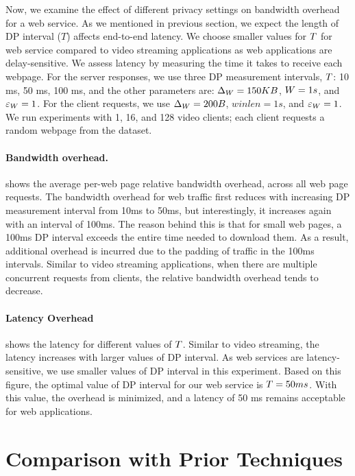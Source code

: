 Now, we examine the effect of different privacy settings on bandwidth overhead for a web service.
As we mentioned in previous section, we expect the length of DP interval ($T$) affects end-to-end latency.
We choose smaller values for $T$ for web service compared to video streaming applications as web applications are delay-sensitive.
We assess latency by measuring the time it takes to receive each webpage.
For the server responses, we use three DP measurement intervals, $T$: 10 ms, 50 ms, 100 ms, and the other parameters are: $\Delta_{W} = 150 KB$, $W = 1s$, and
$\varepsilon_{W} = 1$.
For the client requests, we use $\Delta_{W} = 200 B$, $winlen = 1s$, and $\varepsilon_{W} = 1$.
We run experiments with 1, 16, and 128 video clients; each client requests a random webpage from the dataset.



\paragraph{Bandwidth overhead.}
 shows the average per-web page relative bandwidth overhead, across all web page requests.
The bandwidth overhead for web traffic first reduces with increasing DP measurement interval from 10ms to 50ms, but interestingly, it increases again
with an interval of 100ms.
The reason behind this is that for small web pages, a 100ms DP interval exceeds the entire time needed to download them.
As a result, additional overhead is incurred due to the padding of traffic in the 100ms intervals.
Similar to video streaming applications, when there are multiple concurrent requests from clients, the relative bandwidth overhead tends to decrease.

\paragraph{Latency Overhead}
 shows the latency for different values of $T$.
Similar to video streaming, the latency increases with larger values of DP interval.
As web services are latency-sensitive, we use smaller values of DP interval in this experiment. 
Based on this figure, the optimal value of DP interval for our web service is $T = 50 ms$. 
With this value, the overhead is minimized, and a latency of 50 ms remains acceptable for web applications. 


\section{Comparison with Prior Techniques}\label{sec:eval-comparison-others}


